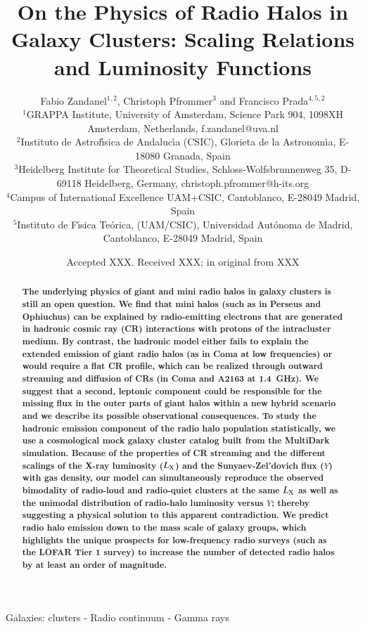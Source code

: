 \documentclass[useAMS,usenatbib]{mn2e}
\title[On the Physics of Radio Halos in Galaxy Clusters]{On the Physics of Radio Halos in Galaxy Clusters: Scaling Relations and Luminosity Functions}
\author[F. Zandanel, C. Pfrommer and F. Prada]{
Fabio Zandanel$^{1,2}$, Christoph Pfrommer$^{3}$ and Francisco Prada$^{4,5,2}$\\
$^{1}$GRAPPA Institute, University of Amsterdam, Science Park 904, 1098XH Amsterdam, Netherlands, f.zandanel@uva.nl\\
$^{2}$Instituto de Astrof\'{\i}sica de Andaluc\'{\i}a (CSIC), Glorieta de la Astronom\'{\i}a, E-18080 Granada, Spain\\
$^{3}$Heidelberg Institute for Theoretical Studies, Schloss-Wolfsbrunnenweg 35, D-69118 Heidelberg, Germany, christoph.pfrommer@h-its.org\\
$^{4}$Campus of International Excellence UAM+CSIC, Cantoblanco, E-28049 Madrid, Spain\\
$^{5}$Instituto de F\'{\i}sica Te\'orica, (UAM/CSIC), Universidad Aut\'onoma de Madrid, Cantoblanco, E-28049 Madrid, Spain}
\begin{document}
\date{Accepted XXX. Received XXX; in original from XXX}

\pagerange{\pageref{firstpage}--\pageref{lastpage}} 

\maketitle

\label{firstpage}

\begin{abstract}
  {\bf The underlying physics of giant and mini radio halos in galaxy clusters
    is still an open question. We find that mini halos (such as in Perseus and
    Ophiuchus) can be explained by radio-emitting electrons that are generated
    in hadronic cosmic ray (CR) interactions with protons of the intracluster
    medium. By contrast, the hadronic model either fails to explain the extended
    emission of giant radio halos (as in Coma at low frequencies) or would
    require a flat CR profile, which can be realized through outward streaming
    and diffusion of CRs (in Coma and A2163 at 1.4~GHz).  We suggest that a
    second, leptonic component could be responsible for the missing flux in the
    outer parts of giant halos within a new hybrid scenario and we describe its
    possible observational consequences.  To study the hadronic emission
    component of the radio halo population statistically, we use a cosmological
    mock galaxy cluster catalog built from the MultiDark simulation. Because of
    the properties of CR streaming and the different scalings of the X-ray
    luminosity ($L_{{\mathrm{X}}}$) and the Sunyaev-Zel'dovich flux ($Y$) with gas
    density, our model can simultaneously reproduce the observed bimodality of
    radio-loud and radio-quiet clusters at the same $L_{{\mathrm{X}}}$ as well as the
    unimodal distribution of radio-halo luminosity versus $Y$; thereby
    suggesting a physical solution to this apparent contradiction. We predict
    radio halo emission down to the mass scale of galaxy groups, which
    highlights the unique prospects for low-frequency radio surveys (such as the
    LOFAR Tier 1 survey) to increase the number of detected radio halos by at
    least an order of magnitude.}
\end{abstract}

\begin{keywords}
  Galaxies: clusters - Radio continuum - Gamma rays
\end{keywords}
\end{document}
